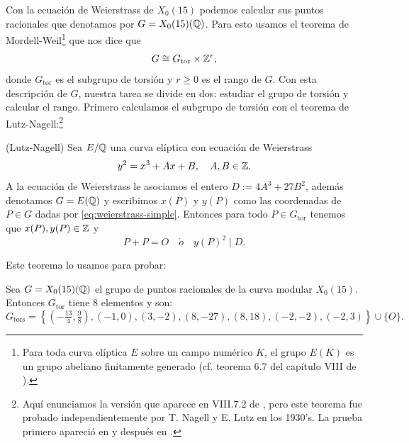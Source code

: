 Con la ecuación de Weierstrass de $X_0(15)$ podemos calcular sus puntos racionales que denotamos por $G=X_0(15)(\mathbb{Q})$. Para esto usamos el teorema de Mordell-Weil\footnote{Para toda curva elíptica $E$ sobre un campo numérico $K$, el grupo $E(K)$ es un grupo abeliano finitamente generado (cf. teorema 6.7 del capítulo VIII de \cite{SilvermanTAOEC}).} que nos dice que
\[
	G\cong G_{\mathrm{tor}}\times\mathbb{Z}^r,
\]
donde $G_{\mathrm{tor}}$ es el subgrupo de torsión y $r\geq0$ es el rango de $G$. Con esta descripción de $G$, nuestra tarea se divide en dos: estudiar el grupo de torsión y calcular el rango. Primero calculamos el subgrupo de torsión con el teorema de Lutz-Nagell:\footnote{Aquí enunciamos la versión que aparece en VIII.7.2 de \cite{SilvermanTAOEC}, pero este teorema fue probado independientemente por T. Nagell y E. Lutz en los 1930's. La prueba primero apareció en \cite{Nagell} y después en \cite{Lutz}.}

\begin{thm}(Lutz-Nagell)\label{thm:Lutz-Nagelll}
	Sea $E/\mathbb{Q}$ una curva elíptica con ecuación de Weierstrass
	\begin{equation}\label{eq:weierstrass-simple}
		y^2=x^3+Ax+B,\quad A,B\in\mathbb{Z}.
	\end{equation}
A la ecuación de Weierstrass le asociamos el entero $D:=4A^3+27B^2$, además denotamos $G=E(\mathbb{Q})$ y escribimos $x(P)$ y $y(P)$ como las coordenadas de $P\in G$ dadas por \eqref{eq:weierstrass-simple}. Entonces para todo $P\in G_{\mathrm{tor}}$ tenemos que $x(P),y(P)\in\mathbb{Z}$ y
\[
	P+P=O\quad\acute{o}\quad y(P)^2\mid D.
\]
\end{thm}

Este teorema lo usamos para probar:

\begin{prop}\label{prop:grupo-torsion-x15}
	Sea $G=X_0(15)(\mathbb{Q})$ el grupo de puntos racionales de la curva modular $X_0(15)$. Entonces $G_\mathrm{tor}$ tiene 8 elementos y son:
	\[
		G_\mathrm{tors}=
		\left\{ \left(-\tfrac{13}{4},\tfrac{9}{8}\right),(-1,0),(3,-2),(8,-27),(8,18),(-2,-2),(-2,3) \right\}\cup\{O\}.
	\]
\end{prop}

